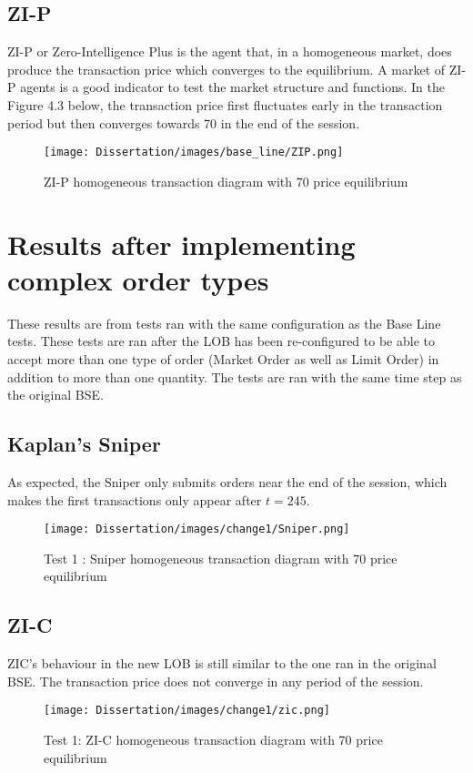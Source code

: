 \subsection{ZI-P}
ZI-P or Zero-Intelligence Plus is the agent that, in a homogeneous market, does produce the transaction price which converges to the equilibrium. A market of ZI-P agents is a good indicator to test the market structure and functions. In the Figure 4.3 below, the transaction price first fluctuates early in the transaction period but then converges towards 70 in the end of the session.  
\begin{figure}[h]
\caption{ZI-P homogeneous transaction diagram with 70 price equilibrium} 
\texttt{[image: Dissertation/images/base\_line/ZIP.png]}
\end{figure} 
\FloatBarrier

\section{Results after implementing complex order types} 
These results are from tests ran with the same configuration as the Base Line tests. These tests are ran after the LOB has been re-configured to be able to accept more than one type of order (Market Order as well as Limit Order) in addition to more than one quantity. The tests are ran with the same time step as the original BSE. 

\subsection{Kaplan's Sniper}
As expected, the Sniper only submits orders near the end of the session, which makes the first transactions only appear after $t = 245$.  
\begin{figure}[h]
\caption{Test 1 : Sniper homogeneous transaction diagram with 70 price equilibrium} 
\texttt{[image: Dissertation/images/change1/Sniper.png]}
\end{figure} 
\FloatBarrier

\subsection{ZI-C}
ZIC's behaviour in the new LOB is still similar to the one ran in the original BSE. The transaction price does not converge in any period of the session. 
\begin{figure}[h]
\caption{Test 1: ZI-C homogeneous transaction diagram with 70 price equilibrium} 
\texttt{[image: Dissertation/images/change1/zic.png]}
\end{figure} 
\FloatBarrier

